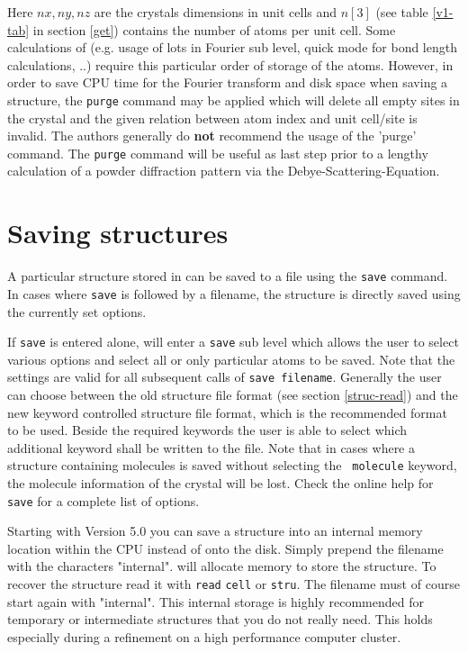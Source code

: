 Here $nx,ny,nz$ are the crystals dimensions in unit cells and $n[3]$
(see table \ref{v1-tab} in section \ref{get}) contains the number 
of atoms per unit cell.
Some calculations of \Discus (e.g.  usage of lots in Fourier
sub level, quick mode for bond length calculations, ..) require this
particular order of storage of the atoms.  However, in order to save
CPU time for the Fourier transform and disk space when saving a
structure, the {\tt purge} command may be applied which will delete
all empty sites in the crystal and the given relation between atom
index and unit cell/site is invalid.  The authors generally do {\bf
not} recommend the usage of the 'purge' command. The {\tt purge} 
command will be useful as last step prior to a lengthy calculation of
a powder diffraction pattern via the Debye-Scattering-Equation.


\section{Saving structures \label{struc-save}}

A particular structure stored in \Discus can be saved to a file
using the {\tt save} command. In cases where {\tt save} is followed
by a filename, the structure is directly saved using the currently
set options. \par

If {\tt save} is entered alone, \Discus will enter a {\tt save}
sub level which allows the user to select various options and select
all or only particular atoms to be saved. Note that the settings are
valid for all subsequent calls of {\tt save filename}. Generally the
user can choose between the old structure file format (see section
\ref{struc-read}) and the new keyword controlled structure file
format, which is the recommended format to be used. Beside the
required keywords the user is able to select which additional
keyword shall be written to the file. Note that in cases where a
structure containing molecules is saved without selecting the {\tt
molecule} keyword, the molecule information of the crystal will be
lost. Check the online help for {\tt save} for a complete list of
options.

Starting with \Discus Version 5.0 you can save a structure into
an internal memory location within the CPU instead of onto the disk.
Simply prepend the filename with the characters "internal". \Discus
will allocate memory to store  the structure. To recover the structure
read it with {\tt read} {\tt cell} or {\tt stru}. The filename must
of course start again with "internal". This internal storage is highly
recommended for temporary or intermediate structures that you do not 
really need. This holds especially during a refinement on a high 
performance computer cluster.

